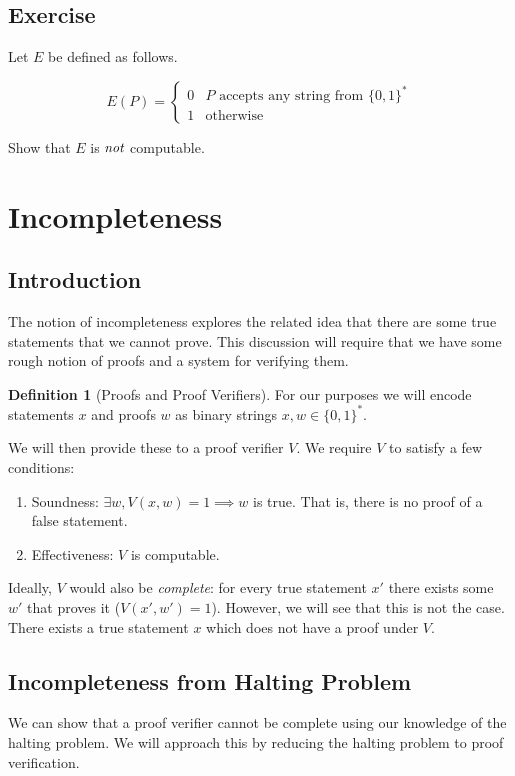 \documentclass[11pt]{article}
\theoremstyle{definition}
\newtheorem{defn}[theorem]{Definition}
\theoremstyle{remark}
\begin{document}
    
    \subsection{Exercise}
    Let $E$ be defined as follows.

   \begin{equation*}
       E(P) = \begin{cases}
           0 & \text{$P$ accepts any string from $\{0, 1\}^*$} \\
            1 & \text{otherwise}
        \end{cases}
    \end{equation*}

    Show that $E$ is $\emph{not}$ computable.


\section{Incompleteness}
\subsection{Introduction}
The notion of incompleteness explores the related idea that
there are some true statements that we cannot prove. This discussion
will require that we have some rough notion of proofs and a system
for verifying them.

\begin{defn}[Proofs and Proof Verifiers]
  \label{def:ppv}
  For our purposes we will encode statements $x$ and proofs $w$ as
  binary strings $x, w \in \{0,1\}^*$.

  We will then provide these to a proof verifier $V$. We require $V$
  to satisfy a few conditions:
  \begin{enumerate}
  \item Soundness: $\exists w, V(x, w) = 1 \implies w$ is true. That
    is, there is no proof of a false statement.
  \item Effectiveness: $V$ is computable.
  \end{enumerate}
\end{defn}

Ideally, $V$ would also be \emph{complete}: for every true statement $x'$
there exists some $w'$ that proves it
($V(x', w') = 1$). However, we will see that this is not the
case. There exists a true statement $x$ which does not have a proof
under $V$.

\subsection{Incompleteness from Halting Problem}
We can show that a proof verifier cannot be complete using our
knowledge of the halting problem. We will approach this by reducing
the halting problem to proof verification.
\end{document}
